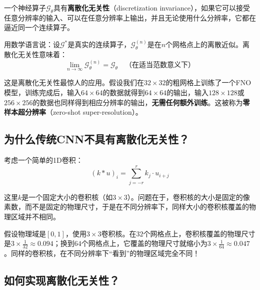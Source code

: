 \begin{definition}[离散化无关性]
一个神经算子$\mathcal{G}_\theta$具有\textbf{离散化无关性}（discretization invariance），如果它可以接受任意分辨率的输入、可以在任意分辨率上输出，并且无论使用什么分辨率，它都在逼近同一个连续算子。
\end{definition}

用数学语言说：设$\mathcal{G}^*$是真实的连续算子，$\mathcal{G}_\theta^{(n)}$是在$n$个网格点上的离散近似。离散化无关性意味着：
\begin{equation}
    \lim_{n \to \infty} \mathcal{G}_\theta^{(n)} = \mathcal{G}_\theta \quad \text{（在适当范数意义下）}
\end{equation}

\begin{example}[零样本超分辨率]
这是离散化无关性最惊人的应用。假设我们在$32 \times 32$的粗网格上训练了一个FNO模型，训练完成后，输入$64 \times 64$的数据就得到$64 \times 64$的输出，输入$128 \times 128$或$256 \times 256$的数据也同样得到相应分辨率的输出，\textbf{无需任何额外训练}。这被称为\textbf{零样本超分辨率}（zero-shot super-resolution）。
\end{example}

\subsection{为什么传统CNN不具有离散化无关性？}

考虑一个简单的1D卷积：
\begin{equation}
    (k * u)_i = \sum_{j=-r}^{r} k_j \cdot u_{i+j}
\end{equation}

这里$k$是一个固定大小的卷积核（如$3 \times 3$）。问题在于，卷积核的大小是固定的像素数，而不是固定的物理尺寸，于是在不同分辨率下，同样大小的卷积核覆盖的物理区域并不相同。

\begin{example}[卷积核的分辨率依赖]
假设物理域是$[0, 1]$，使用$3 \times 3$卷积核。在$32$个网格点上，卷积核覆盖的物理尺寸是$3 \times \frac{1}{32} \approx 0.094$；换到$64$个网格点上，它覆盖的物理尺寸就缩小为$3 \times \frac{1}{64} \approx 0.047$。同样的卷积核，在不同分辨率下“看到”的物理区域完全不同！
\end{example}

\subsection{如何实现离散化无关性？}

